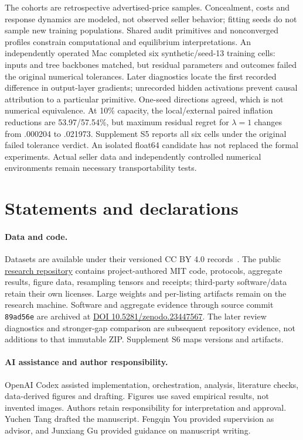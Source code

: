 \documentclass[11pt]{article}
\begin{document}
The cohorts are retrospective advertised-price samples. Concealment, costs
and response dynamics are modeled, not observed seller behavior; fitting
seeds do not sample new training populations. Shared audit primitives and
nonconverged profiles constrain computational and equilibrium interpretations.
An independently operated Mac completed six synthetic/seed-13 training cells:
inputs and tree backbones matched, but residual parameters and outcomes failed
the original numerical tolerances. Later diagnostics locate the first recorded
difference in output-layer gradients; unrecorded hidden activations prevent
causal attribution to a particular primitive. One-seed directions agreed,
which is not numerical equivalence. At 10\% capacity, the local/external paired inflation reductions are 53.97/57.54\%, but maximum residual regret for $\lambda=1$ changes from .000204 to .021973. Supplement S5 reports all six cells under the original failed tolerance verdict. An isolated float64 candidate has not
replaced the formal experiments. Actual seller data and independently
controlled numerical environments remain necessary transportability tests.

\section*{Statements and declarations}
\paragraph{Data and code.}
Datasets are available under their versioned CC BY 4.0 records~\cite{jucarsdata,mucarsdata}.
The public \href{https://github.com/T0Q0R/secondhand-valuation-research}{research repository}
contains project-authored MIT code, protocols, aggregate results, figure data,
resampling tensors and receipts; third-party software/data retain their own
licenses. Large weights and per-listing artifacts remain on the research
machine. Software and aggregate evidence through source commit \texttt{89ad56e} are archived at
\href{https://doi.org/10.5281/zenodo.23447567}{DOI 10.5281/zenodo.23447567}.
The later review diagnostics and stronger-gap comparison are subsequent repository evidence, not additions to that immutable ZIP. Supplement S6 maps versions and artifacts.

\paragraph{AI assistance and author responsibility.}
OpenAI Codex assisted implementation, orchestration, analysis, literature
checks, data-derived figures and drafting. Figures use saved empirical
results, not invented images. Authors retain responsibility for interpretation
and approval. Yuchen Tang drafted the manuscript. Fengqin You provided supervision as advisor, and Junxiang Gu provided guidance on manuscript writing.
\end{document}
